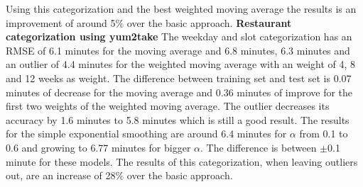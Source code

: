 Using this categorization and the best weighted moving average the results is an improvement of around 5\% over the basic approach.
\newline\newline\textbf{Restaurant categorization using yum2take}\newline
The weekday and slot categorization has an RMSE of 6.1 minutes for the moving average and 6.8 minutes, 6.3 minutes and an outlier of 4.4 minutes for the weighted moving average with an weight of 4, 8 and 12 weeks as weight. The difference between training set and test set is 0.07 minutes of decrease for the moving average and 0.36 minutes of improve for the first two weights of the weighted moving average. The outlier decreases its accuracy by 1.6 minutes to 5.8 minutes which is still a good result. The results for the simple exponential smoothing are around 6.4 minutes for $\alpha$ from 0.1 to 0.6 and growing to 6.77 minutes for bigger $\alpha$. The difference is between $\pm$0.1 minute for these models.\newline
The results of this categorization, when leaving outliers out, are an increase of 28\% over the basic approach.

